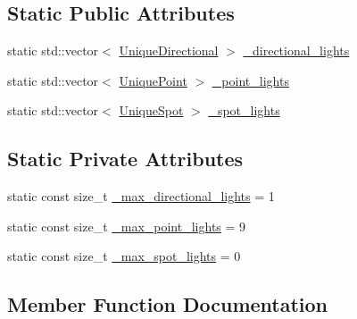 \subsection*{Static Public Attributes}
\begin{DoxyCompactItemize}
\item 
static std\+::vector$<$ \hyperlink{namespaceLarp_af87ce889468b60d51aa1479335ba19bf}{Unique\+Directional} $>$ \hyperlink{classLarp_1_1LightFactory_a2f091bbcfd52ef24817028890ae834f8}{\+\_\+directional\+\_\+lights}
\item 
static std\+::vector$<$ \hyperlink{namespaceLarp_acd7cacff15535544525abc2e90e07b91}{Unique\+Point} $>$ \hyperlink{classLarp_1_1LightFactory_a753c553436a0a8418f9bdc8a96a5ec77}{\+\_\+point\+\_\+lights}
\item 
static std\+::vector$<$ \hyperlink{namespaceLarp_a288b58c470c3ed41d3b23e764ba5b6eb}{Unique\+Spot} $>$ \hyperlink{classLarp_1_1LightFactory_a137f1ae8f92113b5bf59601dc47db5c9}{\+\_\+spot\+\_\+lights}
\end{DoxyCompactItemize}
\subsection*{Static Private Attributes}
\begin{DoxyCompactItemize}
\item 
static const size\+\_\+t \hyperlink{classLarp_1_1LightFactory_a1da82e298c3bedab4b00dbea82639736}{\+\_\+max\+\_\+directional\+\_\+lights} = 1
\item 
static const size\+\_\+t \hyperlink{classLarp_1_1LightFactory_a5e8f45cac917f264a710251979df9484}{\+\_\+max\+\_\+point\+\_\+lights} = 9
\item 
static const size\+\_\+t \hyperlink{classLarp_1_1LightFactory_a81a05e25aac303788b4fe569824263c9}{\+\_\+max\+\_\+spot\+\_\+lights} = 0
\end{DoxyCompactItemize}


\subsection{Member Function Documentation}
